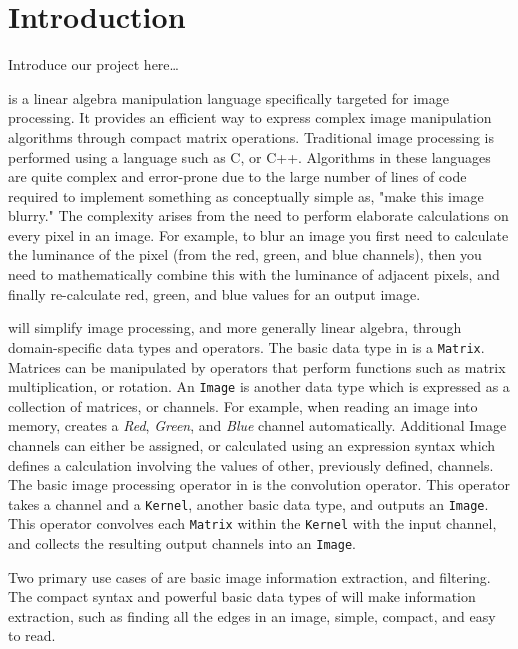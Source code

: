 \chapter{Introduction}

Introduce our project here\ldots

\sys{} is a linear algebra manipulation language specifically targeted for
image processing. It provides an efficient way to express complex image
manipulation algorithms through compact matrix operations. Traditional image
processing is performed using a language such as C, or C++. Algorithms in these
languages are quite complex and error-prone due to the large number of lines of
code required to implement something as conceptually simple as, "make this image
blurry." The complexity arises from the need to perform elaborate calculations
on every pixel in an image. For example, to blur an image you first need to
calculate the luminance of the pixel (from the red, green, and blue channels),
then you need to mathematically combine this with the luminance of adjacent pixels,
and finally re-calculate red, green, and blue values for an output image.

\sys{} will simplify image processing, and more generally linear algebra, through
domain-specific data types and operators. The basic data type in \sys{} is a 
\texttt{Matrix}. Matrices can be manipulated by operators that perform functions
such as matrix multiplication, or rotation. An \texttt{Image} is another \sys{}
data type which is expressed as a collection of matrices, or channels. For example,
when reading an image into memory, \sys{} creates a \emph{Red}, \emph{Green}, and
\emph{Blue} channel automatically. Additional Image channels can either be assigned,
or calculated using an expression syntax which defines a calculation involving the
values of other, previously defined, channels. The basic image processing operator
in \sys{} is the convolution operator. This operator takes a channel and a
\texttt{Kernel}, another basic data type, and outputs an \texttt{Image}. This
operator convolves each \texttt{Matrix} within the \texttt{Kernel} with the input channel,
and collects the resulting output channels into an \texttt{Image}.

Two primary use cases of \sys{} are basic image information extraction, and
filtering. The compact syntax and powerful basic data types of \sys{} will make
information extraction, such as finding all the edges in an image, simple, compact,
and easy to read.

